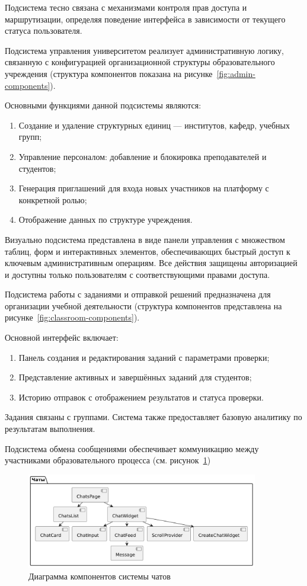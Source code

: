 Подсистема тесно связана с механизмами контроля прав доступа и маршрутизации, определяя поведение интерфейса в зависимости от текущего статуса пользователя.

Подсистема управления университетом реализует административную логику, связанную с конфигурацией организационной структуры образовательного учреждения (структура компонентов показана на рисунке~\ref{fig:admin-components}).

Основными функциями данной подсистемы являются:
\begin{enumerate}
\item Создание и удаление структурных единиц — институтов, кафедр, учебных групп;
\item Управление персоналом: добавление и блокировка преподавателей и студентов;
\item Генерация приглашений для входа новых участников на платформу с конкретной ролью;
\item Отображение данных по структуре учреждения.
\end{enumerate}

Визуально подсистема представлена в виде панели управления с множеством таблиц, форм и интерактивных элементов, обеспечивающих быстрый доступ к ключевым административным операциям. Все действия защищены авторизацией и доступны только пользователям с соответствующими правами доступа.

Подсистема работы с заданиями и отправкой решений предназначена для организации учебной деятельности (структура компонентов представлена на рисунке~\ref{fig:classroom-components}).

Основной интерфейс включает:
\begin{enumerate}
\item Панель создания и редактирования заданий с параметрами проверки;
\item Представление активных и завершённых заданий для студентов;
\item Историю отправок с отображением результатов и статуса проверки.
\end{enumerate}

Задания связаны с группами. Система также предоставляет базовую аналитику по результатам выполнения.

Подсистема обмена сообщениями обеспечивает коммуникацию между участниками образовательного процесса (см. рисунок~\ref{fig:chat-components})

\begin{figure}[h]
\centering
\includegraphics[width=0.9\textwidth]{static/diagrams/ChatsComponentDiagram.png}
\caption{Диаграмма компонентов системы чатов}
\label{fig:chat-components}
\end{figure}

